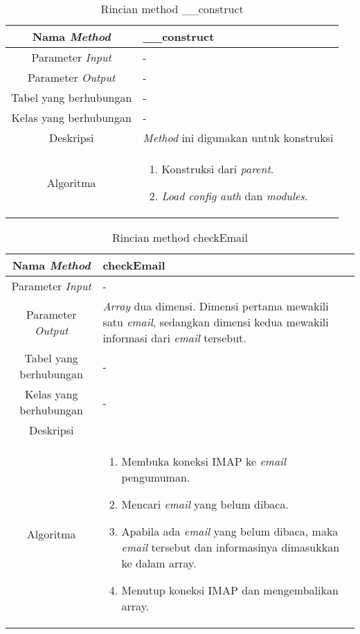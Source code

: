\begin{center}
	\begin{table}[H]
	\caption{Rincian method \_\_construct}
	\label{table:pengumuman-model-construct}
\begin{tabular}{|c|p{11cm}|}
\hline
Nama \textit{Method} 	& 	 	\_\_construct \\
\hline
Parameter \textit{Input} & - \\
\hline
Parameter \textit{Output} & - \\
\hline
Tabel yang berhubungan & -\\
\hline
Kelas yang berhubungan &  - \\
\hline
Deskripsi	& \textit{Method} ini digunakan untuk konstruksi\\
\hline
Algoritma	& \begin{enumerate}
				\item Konstruksi dari \textit{parent}.
				\item \textit{Load config auth} dan \textit{modules}.
				\end{enumerate} \\
\hline
\end{tabular}
\end{table}
\end{center}

\begin{center}
	\begin{table}[H]
	\caption{Rincian method checkEmail}
	\label{table:pengumuman-model-checkemail}
\begin{tabular}{|c|p{11cm}|}
\hline
Nama \textit{Method} 	& 	 	checkEmail\\
\hline
Parameter \textit{Input} & - \\
\hline
Parameter \textit{Output} & \textit{Array} dua dimensi. Dimensi pertama mewakili satu \textit{email}, sedangkan dimensi kedua mewakili informasi dari \textit{email} tersebut.\\
\hline
Tabel yang berhubungan & - \\
\hline
Kelas yang berhubungan & - \\
\hline
Deskripsi	& \\
\hline
Algoritma	& \begin{enumerate}
				\item Membuka koneksi IMAP ke \textit{email} pengumuman.
				\item Mencari \textit{email} yang belum dibaca.
				\item Apabila ada \textit{email} yang belum dibaca, maka \textit{email} tersebut dan informasinya dimasukkan ke dalam array.
				\item Menutup koneksi IMAP dan mengembalikan array.
				\end{enumerate} \\
\hline
\end{tabular}
\end{table}
\end{center}

